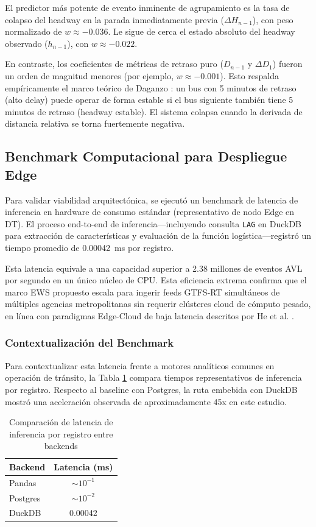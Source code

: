 \documentclass[journal,twocolumn]{IEEEtran}
\begin{document}
El predictor más potente de evento inminente de agrupamiento es la tasa de colapso del headway en la parada inmediatamente previa ($\Delta H_{n-1}$), con peso normalizado de $w \approx -0.036$. Le sigue de cerca el estado absoluto del headway observado ($h_{n-1}$), con $w \approx -0.022$.

En contraste, los coeficientes de métricas de retraso puro ($D_{n-1}$ y $\Delta D_1$) fueron un orden de magnitud menores (por ejemplo, $w \approx -0.001$). Esto respalda empíricamente el marco teórico de Daganzo \cite{1}: un bus con 5 minutos de retraso (alto delay) puede operar de forma estable si el bus siguiente también tiene 5 minutos de retraso (headway estable). El sistema colapsa cuando la derivada de distancia relativa se torna fuertemente negativa.

\subsection{Benchmark Computacional para Despliegue Edge}
Para validar viabilidad arquitectónica, se ejecutó un benchmark de latencia de inferencia en hardware de consumo estándar (representativo de nodo Edge en DT). El proceso end-to-end de inferencia---incluyendo consulta \texttt{LAG} en DuckDB para extracción de características y evaluación de la función logística---registró un tiempo promedio de \SI{0.00042}{\ms} por registro.

Esta latencia equivale a una capacidad superior a 2.38 millones de eventos AVL por segundo en un único núcleo de CPU. Esta eficiencia extrema confirma que el marco EWS propuesto escala para ingerir feeds GTFS-RT simultáneos de múltiples agencias metropolitanas sin requerir clústeres cloud de cómputo pesado, en línea con paradigmas Edge-Cloud de baja latencia descritos por He et al. \cite{26}.

\subsubsection{Contextualización del Benchmark}
Para contextualizar esta latencia frente a motores analíticos comunes en operación de tránsito, la Tabla \ref{tab:benchmark_context_es} compara tiempos representativos de inferencia por registro. Respecto al baseline con Postgres, la ruta embebida con DuckDB mostró una aceleración observada de aproximadamente 45x en este estudio.

\begin{table}[htbp]
	\caption{Comparación de latencia de inferencia por registro entre backends}
	\centering
	\begin{tabular}{@{}lc@{}}
		\toprule
		\textbf{Backend} & \textbf{Latencia (ms)} \\ \midrule
		Pandas           & $\sim 10^{-1}$         \\
		Postgres         & $\sim 10^{-2}$         \\
		DuckDB           & 0.00042                \\ \bottomrule
	\end{tabular}
	\label{tab:benchmark_context_es}
\end{table}
\end{document}
